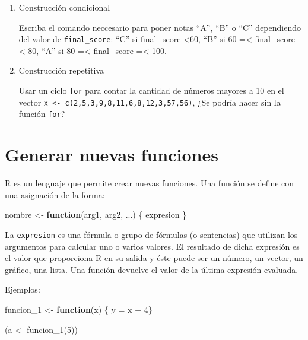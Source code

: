 \documentclass[
]{book}
\newenvironment{Shaded}{\begin{snugshade}}{\end{snugshade}}
\newcommand{\ControlFlowTok}[1]{\textcolor[rgb]{0.13,0.29,0.53}{\textbf{#1}}}
\newcommand{\DecValTok}[1]{\textcolor[rgb]{0.00,0.00,0.81}{#1}}
\newcommand{\FunctionTok}[1]{\textcolor[rgb]{0.00,0.00,0.00}{#1}}
\newcommand{\NormalTok}[1]{#1}
\newcommand{\OtherTok}[1]{\textcolor[rgb]{0.56,0.35,0.01}{#1}}
\newcommand{\SpecialCharTok}[1]{\textcolor[rgb]{0.00,0.00,0.00}{#1}}
\begin{document}
\begin{enumerate}
\def\labelenumi{\arabic{enumi}.}
\item
  Construcción condicional

  Escriba el comando neccesario para poner notas ``A'', ``B'' o ``C'' dependiendo
  del valor de \texttt{final\_score}:
  ``C'' si final\_score \textless60,
  ``B'' si 60 =\textless{} final\_score \textless{} 80,
  ``A'' si 80 =\textless{} final\_score =\textless{} 100.
\item
  Construcción repetitiva

  Usar un ciclo \texttt{for} para contar la cantidad de números mayores a 10 en el
  vector \texttt{x\ \textless{}-\ c(2,5,3,9,8,11,6,8,12,3,57,56)}, ¿Se podría hacer sin la
  función \texttt{for}?
\end{enumerate}

\hypertarget{generar-nuevas-funciones}{%
\chapter{Generar nuevas funciones}\label{generar-nuevas-funciones}}

R es un lenguaje que permite crear nuevas funciones. Una función se define con
una asignación de la forma:

\begin{Shaded}
\begin{Highlighting}[]
\NormalTok{nombre }\OtherTok{\textless{}{-}} \ControlFlowTok{function}\NormalTok{(arg1, arg2, ...) \{}
\NormalTok{   expresion}
\NormalTok{ \}}
\end{Highlighting}
\end{Shaded}

La \texttt{expresion} es una fórmula o grupo de fórmulas (o sentencias) que utilizan
los argumentos para calcular uno o varios valores. El resultado de dicha
expresión es el valor que proporciona R en su salida y éste puede ser un
número, un vector, un gráfico, una lista. Una función devuelve el valor de la
última expresión evaluada.

Ejemplos:

\begin{Shaded}
\begin{Highlighting}[]
\NormalTok{funcion\_1 }\OtherTok{\textless{}{-}} \ControlFlowTok{function}\NormalTok{(x) \{ y }\OtherTok{=}\NormalTok{ x }\SpecialCharTok{+} \DecValTok{4}\NormalTok{\}}

\NormalTok{(a }\OtherTok{\textless{}{-}} \FunctionTok{funcion\_1}\NormalTok{(}\DecValTok{5}\NormalTok{))}
\end{Highlighting}
\end{Shaded}
\end{document}
